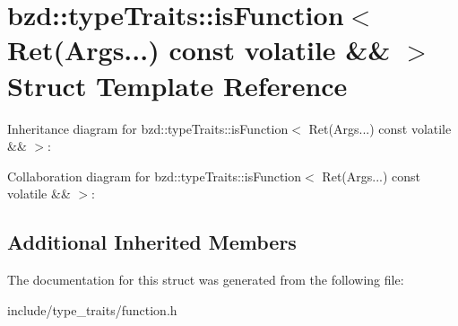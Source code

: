 \hypertarget{structbzd_1_1typeTraits_1_1isFunction_3_01Ret_07Args_8_8_8_08_01const_01volatile_01_6_6_01_4}{}\section{bzd\+:\+:type\+Traits\+:\+:is\+Function$<$ Ret(Args...) const volatile \&\& $>$ Struct Template Reference}
\label{structbzd_1_1typeTraits_1_1isFunction_3_01Ret_07Args_8_8_8_08_01const_01volatile_01_6_6_01_4}


Inheritance diagram for bzd\+:\+:type\+Traits\+:\+:is\+Function$<$ Ret(Args...) const volatile \&\& $>$\+:


Collaboration diagram for bzd\+:\+:type\+Traits\+:\+:is\+Function$<$ Ret(Args...) const volatile \&\& $>$\+:
\subsection*{Additional Inherited Members}


The documentation for this struct was generated from the following file\+:\begin{DoxyCompactItemize}
\item 
include/type\+\_\+traits/function.\+h\end{DoxyCompactItemize}
